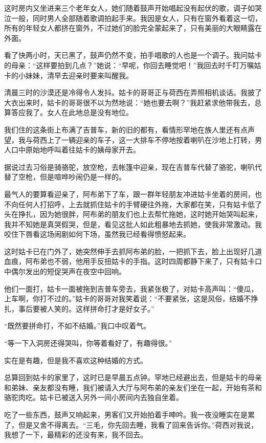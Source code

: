 \par 这时房内又坐进来三个老年女人，她们随着鼓声开始唱起没有起伏的歌，调子如哭泣一般，同时男人全部随着歌调拍起手来。我因是女人，只有在窗外看着这一切，所有的年轻女人都挤在窗外，不过她们的脸完全蒙起来了，只有美丽的大眼睛露在外面。
\par 看了快两小时，天已黑了，鼓声仍然不变，拍手唱歌的人也是一个调子。我问姑卡的母亲：“这样要拍到几点？”她说：“早呢，你回去睡觉吧！”我回去时千叮万嘱姑卡的小妹妹，清早去迎亲时要来叫醒我。
\par 清晨三时的沙漠还是冷得令人发抖。姑卡的哥哥正与荷西在弄照相机谈话。我披了大衣出来时，姑卡的哥哥很不以为然地说：“她也要去啊？”我赶紧求他带我去，总算答应我了。女人在此地总是没有地位。
\par 我们住的这条街上布满了吉普车，新的旧的都有，看情形罕地在族人里还有点声望，我与荷西上了一辆迎亲的车子，这一大排车不停地按着喇叭在沙地上打转，男人口中原始地呼叫着往姑卡的姨母家开去。
\par 据说过去习俗是骑骆驼，放空枪，去帐篷中迎亲，现在吉普车代替了骆驼，喇叭代替了空枪，但是喧哗吵闹仍是一样的。
\par 最气人的要算看迎亲了，阿布弟下了车，跟一群年轻朋友冲进姑卡坐着的房间，也不向任何人打招呼，上去就抓住姑卡的手臂硬往外拖，大家都在笑，只有姑卡低了头在挣扎，因为她很胖，阿布弟的朋友们也上去帮忙拖她，这时她开始哭叫起来，我并不知她是真哭假哭，但是，看见这批人如此粗暴地去抓她，使我非常激动。我咬住下唇看这场闹剧如何下场，虽然我已经看得愤怒起来。
\par 这时姑卡已在门外了，她突然伸手去抓阿布弟的脸，一把抓下去，脸上出现好几道血痕，阿布弟也不弱，他用手反扭姑卡的手指。这时四周都静下来了，只有姑卡口中偶尔发出的短促哭声在夜空中回响。
\par 他们一面打，姑卡一面被拖到吉普车旁去，我紧张极了，对姑卡高声叫：“傻瓜，上车啊，你打不过的。”姑卡的哥哥对我笑着说：“不要紧张，这是风俗，结婚不挣扎，事后要被人笑的。这样拼命打才是好女子。”
\par “既然要拼命打，不如不结婚。”我口中叹着气。
\par “等一下入洞房还得哭叫，你等着看好了，有趣得很。”
\par 实在是有趣，但是我不喜欢这种结婚的方式。
\par 总算回到姑卡的家里了，这时已是早晨五点钟。罕地已经避出去，但是姑卡的母亲和弟妹、亲友都没有睡，我们被请入大厅与阿布弟的亲友们坐在一起，开始有茶和骆驼肉吃。姑卡已被送入另外一间小房间内去独自坐着。
\par 吃了一些东西，鼓声又响起来，男客们又开始拍着手呻吟。我一夜没睡实在是累了，但是又舍不得离去。“三毛，你先回去睡，我看了回来告诉你。”荷西对我说，我想了一下，最精彩的还没有来，我不回去。
